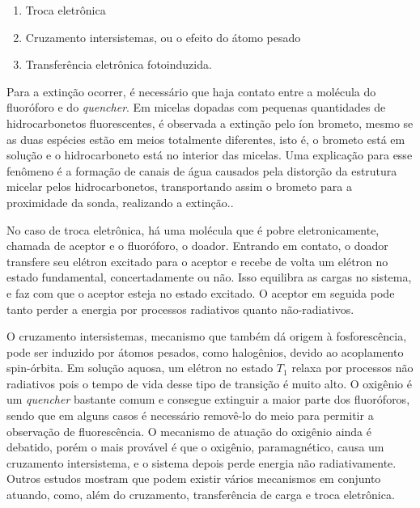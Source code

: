 		\begin{enumerate}[noitemsep]
			\item Troca eletrônica
			\item Cruzamento intersistemas, ou o efeito do átomo pesado
			\item Transferência eletrônica fotoinduzida.
		\end{enumerate}
		
		Para a extinção ocorrer, é necessário que haja contato entre a molécula do fluoróforo e do \emph{quencher}.  Em micelas dopadas com pequenas quantidades de hidrocarbonetos fluorescentes, é observada a extinção pelo íon brometo, mesmo se as duas espécies estão em meios totalmente diferentes, isto é, o brometo está em solução e o hidrocarboneto está no interior das micelas. Uma explicação para esse fenômeno é a formação de canais de água causados pela distorção da estrutura micelar pelos hidrocarbonetos, transportando assim o brometo para a proximidade da sonda, realizando a extinção.\cite{Burrows1980}.
		
		No caso de troca eletrônica, há uma molécula que é pobre eletronicamente, chamada de aceptor e o fluoróforo, o doador. Entrando em contato, o doador transfere seu elétron excitado para o aceptor e recebe de volta um elétron no estado fundamental, concertadamente ou não. Isso equilibra as cargas no sistema, e faz com que o aceptor esteja no estado excitado. O aceptor em seguida pode tanto perder a energia por processos radiativos quanto não-radiativos. \cite{Lakowicz2006}
		
		O cruzamento intersistemas,  mecanismo que também dá origem à fosforescência, pode ser induzido por átomos pesados, como halogênios, devido ao acoplamento spin-órbita. Em solução aquosa, um elétron no estado \(T_1\) relaxa por processos não radiativos pois o tempo de vida desse tipo de transição é muito alto. O oxigênio é um \emph{quencher} bastante comum e consegue extinguir a maior parte dos fluoróforos, sendo que em alguns casos é necessário removê-lo do meio para permitir a observação de fluorescência. O mecanismo de atuação do oxigênio ainda é debatido, porém o mais provável é que o oxigênio, paramagnético, causa um cruzamento intersistema, e o sistema depois perde energia não radiativamente. Outros estudos mostram que podem existir vários mecanismos em conjunto atuando, como, além do cruzamento, transferência de carga e troca eletrônica. \cite{Lakowicz2006} 
		
